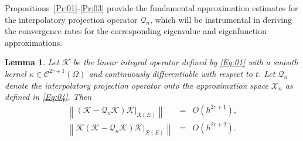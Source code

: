 \documentclass[]{interact}
\theoremstyle{plain}%
\newtheorem{lemma}[theorem]{Lemma}
\theoremstyle{definition}
\theoremstyle{remark}
\newcommand{\norm}[1]{\left\lVert #1\right\rVert}
\begin{document}
Propositions~\ref{Pr:01}-\ref{Pr:03} provide the fundamental approximation estimates for the interpolatory projection operator $\mathcal{Q}_n$, which will be instrumental in deriving the convergence rates for the corresponding eigenvalue and eigenfunction approximations.
\begin{lemma} \label{Lem:04}
	Let \(\mathcal{K}\) be the linear integral operator defined by \eqref{Eq:01} with a smooth kernel $\kappa \in\mathcal{C}^{2r+1}(\Omega)$ and continuously differentiable with respect to $t$. Let \(\mathcal{Q}_n\) denote the interpolatory projection operator onto the approximation space \(\mathcal{X}_n\) as defined in \eqref{Eq:04}. Then
	\begin{eqnarray*}
		\norm{(\mathcal{K} - \mathcal{Q}_n \mathcal{K}) \mathcal{K} |_{\mathcal{R}(E)} } &=& O\left(h^{2r + 1}\right), \\
		\norm{ \mathcal{K} (\mathcal{K} - \mathcal{Q}_n \mathcal{K}) \mathcal{K} |_{\mathcal{R}(E)} } &=& O\left(h^{2r + 2}\right).
	\end{eqnarray*}
\end{lemma}
\vspace*{-0.2in}
\end{document}
